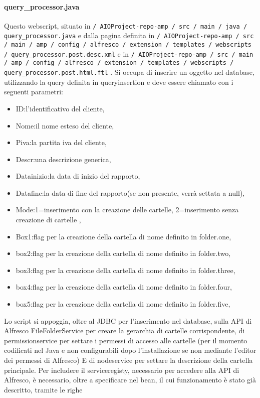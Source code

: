 \paragraph{query\_processor.java}
Questo webscript, situato in \texttt{/ AIOProject-repo-amp / src / main / java / query\_processor.java} e dalla pagina definita in \texttt{/ AIOProject-repo-amp / src / main / amp / config / alfresco / extension / templates / webscripts / query\_processor.post.desc.xml} e in \texttt{/ AIOProject-repo-amp / src / main / amp / config / alfresco / extension / templates / webscripts / query\_processor.post.html.ftl} . Si occupa di inserire un oggetto nel database, utilizzando la query definita in  queryinsertion e deve essere chiamato con i seguenti parametri:
\begin{itemize}
\item ID:l’identificativo del cliente,
\item Nome:il nome esteso del cliente,
\item Piva:la partita iva del cliente,
\item Descr:una descrizione generica,
\item Datainizio:la data di inizio del rapporto,
\item Datafine:la data di fine del rapporto(se non presente, verrà settata a null),
\item Mode:1=inserimento con la creazione delle cartelle, 2=inserimento senza creazione di cartelle ,
\item Box1:flag per la creazione della cartella di nome definito in folder.one,
\item box2:flag per la creazione della cartella di nome definito in folder.two,
\item box3:flag per la creazione della cartella di nome definito in folder.three,
\item box4:flag per la creazione della cartella di nome definito in folder.four,
\item box5:flag per la creazione della cartella di nome definito in folder.five,
\end{itemize}
Lo script si appoggia, oltre al JDBC per l’inserimento nel database, sulla API di Alfresco 
FileFolderService per creare la gerarchia di cartelle corrispondente, di permissionservice per settare i permessi di accesso alle cartelle (per il momento codificati nel Java e non configurabili dopo l’installazione se non mediante l’editor dei permessi di Alfresco)
E di nodeservice per settare la descrizione della cartella principale.
Per includere il serviceregisty, necessario per accedere alla API di Alfresco, è necessario, oltre a specificare  nel bean, il cui funzionamento è stato già descritto, tramite le righe
